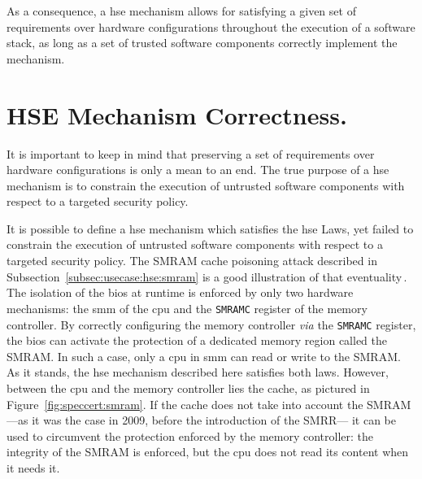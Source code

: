 As a consequence, a \ac{hse} mechanism allows for satisfying a given set of
requirements over hardware configurations throughout the execution of a software
stack, as long as a set of trusted software components correctly implement the
mechanism.

\section{HSE Mechanism Correctness.}
\label{sec:speccert:security}

It is important to keep in mind that preserving a set of requirements over
hardware configurations is only a mean to an end.
%
The true purpose of a \ac{hse} mechanism is to constrain the execution of
untrusted software components with respect to a targeted security policy.

It is possible to define a \ac{hse} mechanism which satisfies the \ac{hse} Laws,
yet failed to constrain the execution of untrusted software components with
respect to a targeted security policy.
%
The SMRAM cache poisoning attack described in
Subsection~\ref{subsec:usecase:hse:smram} is a good illustration of that
eventuality\,\cite{duflot2009smram,wojtczuk2009smram}.
%
The isolation of the \ac{bios} at runtime is enforced by only two hardware
mechanisms: the \ac{smm} of the \ac{cpu} and the \texttt{SMRAMC} register of the
memory controller.
%
By correctly configuring the memory controller \emph{via} the \texttt{SMRAMC}
register, the \ac{bios} can activate the protection of a dedicated memory region
called the SMRAM.
%
In such a case, only a \ac{cpu} in \ac{smm} can read or write to the SMRAM.
%
As it stands, the \ac{hse} mechanism described here satisfies both laws.
%
However, between the \ac{cpu} and the memory controller lies the cache, as
pictured in Figure~\ref{fig:speccert:smram}.
%
If the cache does not take into account the SMRAM ---as it was the case in 2009,
before the introduction of the SMRR--- it can be used to circumvent the
protection enforced by the memory controller: the integrity of the SMRAM is
enforced, but the \ac{cpu} does not read its content when it needs it.

